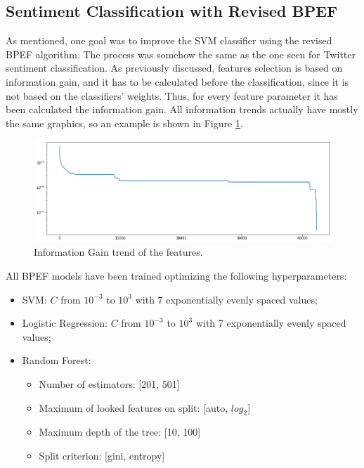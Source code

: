 \subsection{Sentiment Classification with Revised BPEF}

As mentioned, one goal was to improve the SVM classifier using the revised BPEF algorithm. The process was somehow the same as the one seen for Twitter sentiment classification. As previously discussed, features selection is based on information gain, and it has to be calculated before the classification, since it is not based on the classifiers' weights. Thus, for every feature parameter it has been calculated the information gain. All information trends actually have mostly the same graphics, so an example is shown in Figure \ref{fig:ita_bpef_fs_1}.

\begin{figure}[H]
	\centering
	\includegraphics[width=\textwidth]{figures/conf_matrices/ita_snt_bpef/bpef_fs_1.png}
	\caption{Information Gain trend of the features.}
	\label{fig:ita_bpef_fs_1}
\end{figure}

All BPEF models have been trained optimizing the following hyperparameters:
\begin{itemize}
	\item SVM: $C$ from $10^{-3}$ to $10^3$ with 7 exponentially evenly spaced values;
	\item Logistic Regression: $C$ from $10^{-3}$ to $10^3$ with 7 exponentially evenly spaced values;
	\item Random Forest: 
	\begin{itemize}
		\item Number of estimators: [201, 501]
		\item Maximum of looked features on split: [auto, $log_2$]
		\item Maximum depth of the tree: [10, 100]
		\item Split criterion: [gini, entropy]
	\end{itemize}
\end{itemize}

